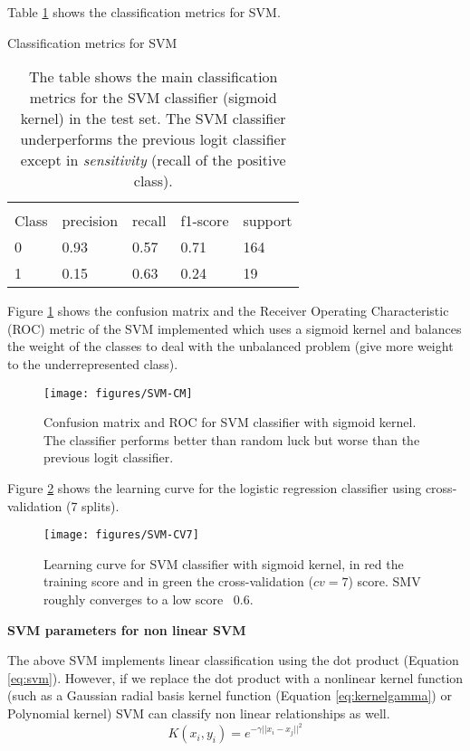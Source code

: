 \documentclass[11pt]{article}
\begin{document}
Table \ref{tab:svm} shows the classification metrics for SVM.
\begin{table}[H]
\caption{Classification metrics for SVM} \label{tab:svm} 
\begin{center} 
\begin{tabular}{lllll}
\hline
\multicolumn{1}{c}{} \\
Class & precision & recall & f1-score & support     \\
\hline
0 & 0.93  &    0.57   &   0.71   &    164 \\
1 & 0.15  &    0.63   &   0.24   &    19 \\
\hline
\end{tabular}
\caption{The table shows the main classification metrics for the SVM classifier (sigmoid kernel) in the test set. The SVM classifier underperforms the previous logit classifier except in \emph{sensitivity} (recall of the positive class).}
\end{center}
\end{table}

Figure \ref{fig:svm-cm} shows the confusion matrix and the Receiver Operating Characteristic (ROC) metric of the SVM implemented which uses a sigmoid kernel and balances the weight of the classes to deal with the unbalanced problem (give more weight to the underrepresented class).
\begin{figure}[H]
        \centering
        \texttt{[image: figures/SVM-CM]}
        \caption{Confusion matrix and ROC for SVM classifier with sigmoid kernel. The classifier performs better than random luck but worse than the previous logit classifier.}
\label{fig:svm-cm}
\end{figure}

Figure \ref{fig:svm-cv7} shows the learning curve for the logistic regression classifier using cross-validation (7 splits).
\begin{figure}[H]
        \centering
        \texttt{[image: figures/SVM-CV7]}
        \caption{Learning curve for SVM classifier with sigmoid kernel, in red the training score and in green the cross-validation ($cv=7$) score. SMV roughly converges to a low score ~0.6.
        }
\label{fig:svm-cv7}
\end{figure}

\textbf{SVM parameters for non linear SVM}

The above SVM implements linear classification using the dot product (Equation \ref{eq:svm}). However, if we replace the dot product with a nonlinear kernel function (such as a Gaussian radial basis kernel function (Equation \ref{eq:kernelgamma}) or Polynomial kernel) SVM can classify non linear relationships as well.
\begin{equation} \label{eq:kernelgamma}
K(x_i,y_i) = e^{-\gamma ||x_i-x_j||^2}
\end{equation}
\end{document}
